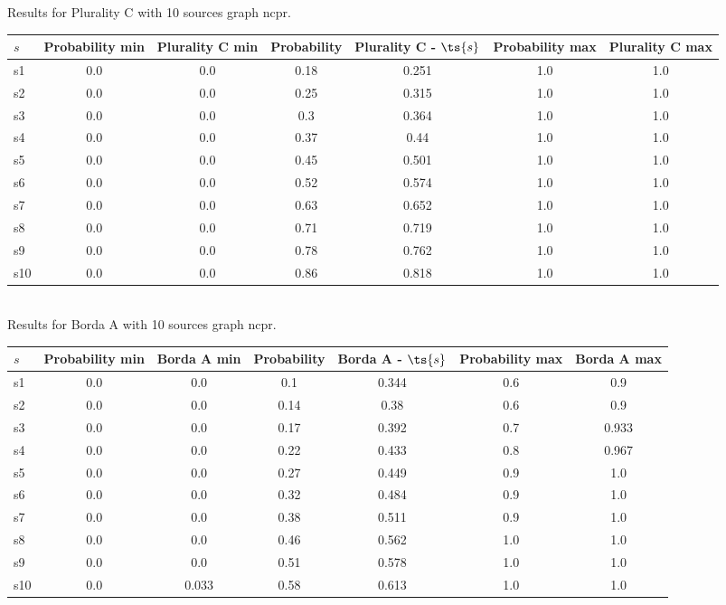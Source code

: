 \documentclass{article}
\begin{document}
\noindent Results for Plurality C with 10 sources graph ncpr.

\noindent\begin{tabular}{|l|c|c|c|c|c|c|}
\hline
$s$& Probability min & Plurality C min & Probability & Plurality C - $\ts{s}$ & Probability max & Plurality C max\\
\hline
s1 &0.0 & 0.0 & 0.18 & 0.251 & 1.0 & 1.0\\
\hline
s2 &0.0 & 0.0 & 0.25 & 0.315 & 1.0 & 1.0\\
\hline
s3 &0.0 & 0.0 & 0.3 & 0.364 & 1.0 & 1.0\\
\hline
s4 &0.0 & 0.0 & 0.37 & 0.44 & 1.0 & 1.0\\
\hline
s5 &0.0 & 0.0 & 0.45 & 0.501 & 1.0 & 1.0\\
\hline
s6 &0.0 & 0.0 & 0.52 & 0.574 & 1.0 & 1.0\\
\hline
s7 &0.0 & 0.0 & 0.63 & 0.652 & 1.0 & 1.0\\
\hline
s8 &0.0 & 0.0 & 0.71 & 0.719 & 1.0 & 1.0\\
\hline
s9 &0.0 & 0.0 & 0.78 & 0.762 & 1.0 & 1.0\\
\hline
s10 &0.0 & 0.0 & 0.86 & 0.818 & 1.0 & 1.0\\
\hline
\end{tabular}\\

\noindent Results for Borda A with 10 sources graph ncpr.

\noindent\begin{tabular}{|l|c|c|c|c|c|c|}
\hline
$s$& Probability min & Borda A min & Probability & Borda A - $\ts{s}$ & Probability max & Borda A max\\
\hline
s1 &0.0 & 0.0 & 0.1 & 0.344 & 0.6 & 0.9\\
\hline
s2 &0.0 & 0.0 & 0.14 & 0.38 & 0.6 & 0.9\\
\hline
s3 &0.0 & 0.0 & 0.17 & 0.392 & 0.7 & 0.933\\
\hline
s4 &0.0 & 0.0 & 0.22 & 0.433 & 0.8 & 0.967\\
\hline
s5 &0.0 & 0.0 & 0.27 & 0.449 & 0.9 & 1.0\\
\hline
s6 &0.0 & 0.0 & 0.32 & 0.484 & 0.9 & 1.0\\
\hline
s7 &0.0 & 0.0 & 0.38 & 0.511 & 0.9 & 1.0\\
\hline
s8 &0.0 & 0.0 & 0.46 & 0.562 & 1.0 & 1.0\\
\hline
s9 &0.0 & 0.0 & 0.51 & 0.578 & 1.0 & 1.0\\
\hline
s10 &0.0 & 0.033 & 0.58 & 0.613 & 1.0 & 1.0\\
\hline
\end{tabular}\\
\end{document}
